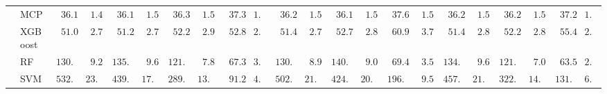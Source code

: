 \begin{tabular}{p{0.2cm}p{1cm}|p{0.6cm}p{0.6cm}|p{0.6cm}p{0.6cm}p{0.6cm}p{0.6cm}p{0.6cm}p{0.6cm}|p{0.6cm}p{0.6cm}p{0.6cm}p{0.6cm}p{0.6cm}p{0.6cm}|p{0.6cm}p{0.6cm}p{0.6cm}p{0.6cm}p{0.6cm}p{0.6cm}}
 & MCP  & $\phantom{0}36.19$ & $\phantom{0}1.49$ & $\phantom{0}36.19$ & $\phantom{0}1.55$ & $\phantom{0}36.30$ & $\phantom{0}1.56$ & $\phantom{0}37.39$ & $1.62$ & $\phantom{0}36.21$ & $\phantom{0}1.55$ & $\phantom{0}36.19$ & $\phantom{0}1.51$ & $\phantom{0}37.69$ & $\phantom{0}1.53$ & $\phantom{0}36.23$ & $\phantom{0}1.51$ & $\phantom{0}36.26$ & $\phantom{0}1.55$ & $\phantom{0}37.29$ & $1.57$ \\
 & XGBoost  & $\phantom{0}51.08$ & $\phantom{0}2.73$ & $\phantom{0}51.24$ & $\phantom{0}2.72$ & $\phantom{0}52.21$ & $\phantom{0}2.96$ & $\phantom{0}52.85$ & $2.67$ & $\phantom{0}51.44$ & $\phantom{0}2.71$ & $\phantom{0}52.78$ & $\phantom{0}2.88$ & $\phantom{0}60.95$ & $\phantom{0}3.75$ & $\phantom{0}51.48$ & $\phantom{0}2.83$ & $\phantom{0}52.20$ & $\phantom{0}2.85$ & $\phantom{0}55.40$ & $2.96$ \\
 & RF  & $130.46$ & $\phantom{0}9.29$ & $135.14$ & $\phantom{0}9.66$ & $121.75$ & $\phantom{0}7.87$ & $\phantom{0}67.30$ & $3.26$ & $130.90$ & $\phantom{0}8.92$ & $140.14$ & $\phantom{0}9.02$ & $\phantom{0}69.44$ & $\phantom{0}3.53$ & $134.46$ & $\phantom{0}9.61$ & $121.42$ & $\phantom{0}7.05$ & $\phantom{0}63.58$ & $2.97$ \\
 & SVM  & $532.95$ & $23.61$ & $439.60$ & $17.79$ & $289.85$ & $13.10$ & $\phantom{0}91.22$ & $4.25$ & $502.81$ & $21.47$ & $424.26$ & $20.66$ & $196.59$ & $\phantom{0}9.51$ & $457.51$ & $21.50$ & $322.04$ & $14.34$ & $131.03$ & $6.13$ \\
\hline 
\end{tabular}

